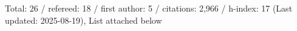 Total: 26 / refereed: 18 / first author: 5 / citations: 2,966 / h-index: 17 (Last updated: 2025-08-19), List attached below